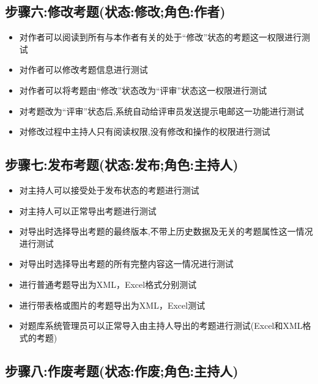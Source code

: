 \documentclass[hyperref, a4paper]{ctexart}
\providecommand{\tightlist}{%
  \setlength{\itemsep}{0pt}\setlength{\parskip}{0pt}}
\begin{document}
\hypertarget{ux6b65ux9aa4ux516dux4feeux6539ux8003ux9898ux72b6ux6001ux4feeux6539ux89d2ux8272ux4f5cux8005}{%
\subsection{步骤六:修改考题(状态:修改;角色:作者)}\label{ux6b65ux9aa4ux516dux4feeux6539ux8003ux9898ux72b6ux6001ux4feeux6539ux89d2ux8272ux4f5cux8005}}

\begin{itemize}
\tightlist
\item
  对作者可以阅读到所有与本作者有关的处于``修改''状态的考题这一权限进行测试
\item
  对作者可以修改考题信息进行测试
\item
  对作者可以将考题由``修改''状态改为``评审''状态这一权限进行测试
\item
  对考题改为``评审''状态后,系统自动给评审员发送提示电邮这一功能进行测试
\item
  对修改过程中主持人只有阅读权限,没有修改和操作的权限进行测试
\end{itemize}

\hypertarget{ux6b65ux9aa4ux4e03ux53d1ux5e03ux8003ux9898ux72b6ux6001ux53d1ux5e03ux89d2ux8272ux4e3bux6301ux4eba}{%
\subsection{步骤七:发布考题(状态:发布;角色:主持人)}\label{ux6b65ux9aa4ux4e03ux53d1ux5e03ux8003ux9898ux72b6ux6001ux53d1ux5e03ux89d2ux8272ux4e3bux6301ux4eba}}

\begin{itemize}
\tightlist
\item
  对主持人可以接受处于发布状态的考题进行测试
\item
  对主持人可以正常导出考题进行测试
\item
  对导出时选择导出考题的最终版本,不带上历史数据及无关的考题属性这一情况进行测试
\item
  对导出时选择导出考题的所有完整内容这一情况进行测试
\item
  进行普通考题导出为XML，Excel格式分别测试
\item
  进行带表格或图片的考题导出为XML，Excel测试
\item
  对题库系统管理员可以正常导入由主持人导出的考题进行测试(Excel和XML格式的考题)
\end{itemize}

\hypertarget{ux6b65ux9aa4ux516bux4f5cux5e9fux8003ux9898ux72b6ux6001ux4f5cux5e9fux89d2ux8272ux4e3bux6301ux4eba}{%
\subsection{步骤八:作废考题(状态:作废;角色:主持人)}\label{ux6b65ux9aa4ux516bux4f5cux5e9fux8003ux9898ux72b6ux6001ux4f5cux5e9fux89d2ux8272ux4e3bux6301ux4eba}}
\end{document}
